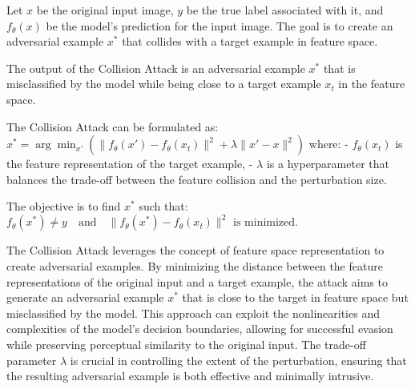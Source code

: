 Let $x$ be the original input image, $y$ be the true label associated with it, and $f_\theta(x)$ be the model's prediction for the input image. The goal is to create an adversarial example $x^*$ that collides with a target example in feature space.

The output of the Collision Attack is an adversarial example $x^*$ that is misclassified by the model while being close to a target example $x_t$ in the feature space.

The Collision Attack can be formulated as:
$x^* = \arg\min_{x'} \left( \|f_\theta(x') - f_\theta(x_t)\|^2 + \lambda \|x' - x\|^2 \right)$
where:
- $f_\theta(x_t)$ is the feature representation of the target example,
- $\lambda$ is a hyperparameter that balances the trade-off between the feature collision and the perturbation size.

The objective is to find $x^*$ such that:
$f_\theta(x^*) \neq y \quad \text{and} \quad \|f_\theta(x^*) - f_\theta(x_t)\|^2 \text{ is minimized.}$

The Collision Attack leverages the concept of feature space representation to create adversarial examples. By minimizing the distance between the feature representations of the original input and a target example, the attack aims to generate an adversarial example $x^*$ that is close to the target in feature space but misclassified by the model. This approach can exploit the nonlinearities and complexities of the model's decision boundaries, allowing for successful evasion while preserving perceptual similarity to the original input. The trade-off parameter $\lambda$ is crucial in controlling the extent of the perturbation, ensuring that the resulting adversarial example is both effective and minimally intrusive.
